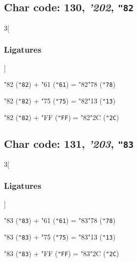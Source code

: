 \documentclass{article}
\newlength{\maxcharwidth}
\begin{document}
\subsection{Char code: 130, {\it'202}, {\tt"82}}
\label{char_130}


\begin{multicols}{3}[\subsubsection{Ligatures}]

{\testfont\char"82\noboundary} ({\tt"82}) + {\testfont\char"61\noboundary} ({\tt"61}) = {\testfont\char"82\noboundary}{\testfont\char"78\noboundary} ({\tt"78}) 

{\testfont\char"82\noboundary} ({\tt"82}) + {\testfont\char"75\noboundary} ({\tt"75}) = {\testfont\char"82\noboundary}{\testfont\char"13\noboundary} ({\tt"13}) 

{\testfont\char"82\noboundary} ({\tt"82}) + {\testfont\char"FF\noboundary} ({\tt"FF}) = {\testfont\char"82\noboundary}{\testfont\char"2C\noboundary} ({\tt"2C}) 

\end{multicols}

\subsection{Char code: 131, {\it'203}, {\tt"83}}
\label{char_131}


\begin{multicols}{3}[\subsubsection{Ligatures}]

{\testfont\char"83\noboundary} ({\tt"83}) + {\testfont\char"61\noboundary} ({\tt"61}) = {\testfont\char"83\noboundary}{\testfont\char"78\noboundary} ({\tt"78}) 

{\testfont\char"83\noboundary} ({\tt"83}) + {\testfont\char"75\noboundary} ({\tt"75}) = {\testfont\char"83\noboundary}{\testfont\char"13\noboundary} ({\tt"13}) 

{\testfont\char"83\noboundary} ({\tt"83}) + {\testfont\char"FF\noboundary} ({\tt"FF}) = {\testfont\char"83\noboundary}{\testfont\char"2C\noboundary} ({\tt"2C}) 

\end{multicols}
\end{document}
